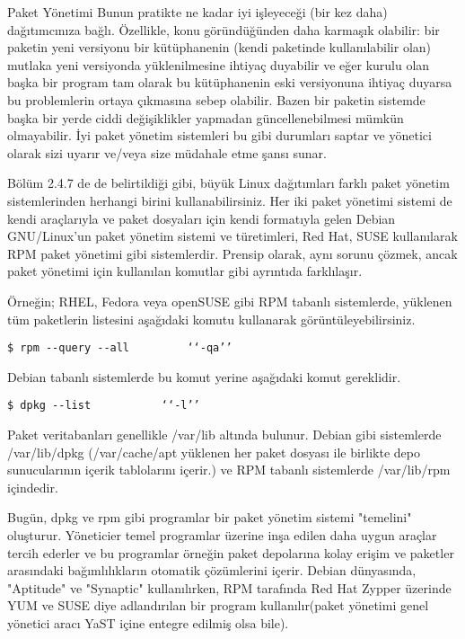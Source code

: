\begin{section}{Paket Yönetimi}
Bunun pratikte ne kadar iyi işleyeceği (bir kez daha) dağıtımcınıza bağlı. Özellikle, konu göründüğünden daha karmaşık olabilir: bir paketin yeni versiyonu bir kütüphanenin (kendi paketinde kullanılabilir olan) mutlaka yeni versiyonda yüklenilmesine ihtiyaç duyabilir ve eğer kurulu olan başka bir program tam olarak bu kütüphanenin eski versiyonuna ihtiyaç duyarsa bu problemlerin ortaya çıkmasına sebep olabilir. Bazen bir paketin sistemde başka bir yerde ciddi değişiklikler yapmadan güncellenebilmesi mümkün olmayabilir. İyi paket yönetim sistemleri bu gibi durumları saptar ve yönetici olarak sizi uyarır ve/veya size 	müdahale etme şansı sunar.

Bölüm 2.4.7 de de belirtildiği gibi, büyük Linux dağıtımları farklı paket yönetim sistemlerinden herhangi birini kullanabilirsiniz. Her iki paket yönetimi sistemi de kendi araçlarıyla ve paket dosyaları için kendi formatıyla gelen Debian GNU/Linux'un paket yönetim sistemi ve türetimleri, Red Hat, SUSE kullanılarak RPM paket yönetimi gibi sistemlerdir. Prensip olarak, aynı sorunu çözmek, ancak paket yönetimi için kullanılan komutlar gibi ayrıntıda farklılaşır.

Örneğin; RHEL, Fedora veya openSUSE gibi RPM tabanlı sistemlerde, yüklenen tüm paketlerin listesini aşağıdaki komutu kullanarak görüntüleyebilirsiniz.
\begin{verbatim}
$ rpm --query --all 		‘‘-qa’’
\end{verbatim}

Debian tabanlı sistemlerde bu komut yerine aşağıdaki komut gereklidir.
\begin{verbatim}
$ dpkg --list 			‘‘-l’’
\end{verbatim}

Paket veritabanları genellikle /var/lib altında bulunur. Debian gibi sistemlerde /var/lib/dpkg (/var/cache/apt yüklenen her paket dosyası ile birlikte depo 
sunucularının içerik tablolarını içerir.) ve RPM tabanlı sistemlerde /var/lib/rpm içindedir.
  
Bugün, dpkg ve rpm gibi programlar bir paket yönetim sistemi "temelini" oluşturur. Yöneticier temel programlar üzerine inşa edilen daha uygun araçlar tercih ederler ve bu programlar örneğin paket depolarına kolay erişim ve paketler arasındaki bağımlılıkların otomatik çözümlerini içerir. Debian dünyasında, "Aptitude" ve "Synaptic" kullanılırken, RPM tarafında Red Hat Zypper üzerinde YUM ve SUSE diye adlandırılan bir program kullanılır(paket yönetimi  genel yönetici aracı YaST içine entegre edilmiş olsa bile).


\end{section}
